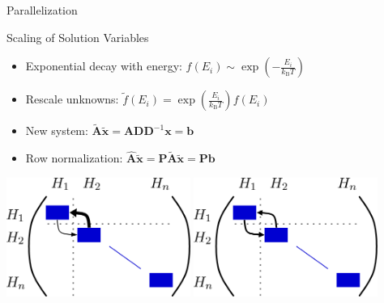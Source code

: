 \documentclass[usepdftitle=false,handout,10pt]{beamer}
\renewcommand{\matrix}[1]{\boldsymbol{#1}}
\renewcommand{\vector}[1]{\boldsymbol{#1}}
\begin{document}
\begin{frame}{Parallelization}
 \begin{block}{Scaling of Solution Variables}
  \begin{itemize}
   \item Exponential decay with energy: $f(E_i) \sim \exp(- \frac{E_i}{k_\mathrm{B} T})$
   \item Rescale unknowns: $\tilde{f}(E_i) = \exp( \frac{E_i}{k_\mathrm{B} T}) f(E_i)$
   \item New system: $\tilde{\matrix A} \tilde{\vector x} = \matrix A \matrix D \matrix D^{-1} \vector x = \vector b$
   \item Row normalization: $\hat{\matrix A} \tilde{\vector x} = \matrix P \tilde{\matrix A} \tilde{\vector x} = \matrix P \vector b$
  \end{itemize}
  \begin{center}
   \includegraphics[width=0.45\textwidth]{matrix-structure-1} \hfill
   \includegraphics[width=0.45\textwidth]{matrix-structure-2}
  \end{center}
 \end{block}

\end{frame}
\end{document}
